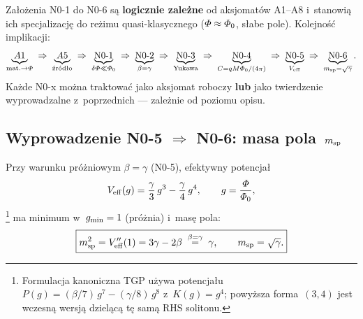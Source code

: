 \begin{remark}
Za\l{}o\.zenia N0-1 do N0-6 s\k{a} \textbf{logi\-cznie zale\.zne}
od aksjomat\'ow A1--A8 i~stanowi\k{a} ich spe\-cjali\-zacj\k{e}
do re\.zimu quasi-klasycznego ($\varPhi \approx \varPhi_0$, s\l{}abe pole).
Kolejno\'s\'c implikacji:
\begin{equation*}
  \underbrace{A1}_{\text{mat.}\to\Phi}
  \;\Rightarrow\;
  \underbrace{A5}_{\text{\'zr\'od\l{}o}}
  \;\Rightarrow\;
  \underbrace{\text{N0-1}}_{\delta\Phi\ll\PhiZero}
  \;\Rightarrow\;
  \underbrace{\text{N0-2}}_{\beta=\gamma}
  \;\Rightarrow\;
  \underbrace{\text{N0-3}}_{\text{Yukawa}}
  \;\Rightarrow\;
  \underbrace{\text{N0-4}}_{C=qM\Phi_0/(4\pi)}
  \;\Rightarrow\;
  \underbrace{\text{N0-5}}_{V_{\mathrm{eff}}}
  \;\Rightarrow\;
  \underbrace{\text{N0-6}}_{m_{\mathrm{sp}}=\sqrt{\gamma}}.
\end{equation*}
Ka\.zde N0-x mo\.zna traktowa\'c jako aksjomat roboczy \textbf{lub} jako
twierdzenie wyprowadzalne z~poprzednich --- zale\.znie od poziomu opisu.
\end{remark}

\subsection{Wyprowadzenie N0-5 $\Rightarrow$ N0-6: masa pola~$m_{\rm sp}$}%
\label{ssec:N0-derivation}

\begin{proposition}[N0-6 wynika z~N0-5]%
\label{prop:N0-6-from-N0-5}
Przy warunku pr\'o\.zniowym $\beta = \gamma$ (N0-5),
efektywny potencja\l{}
\begin{equation}\label{eq:Veff-N0-5}
  V_{\rm eff}(g) = \frac{\gamma}{3}\,g^3 - \frac{\gamma}{4}\,g^4,
  \qquad g = \frac{\varPhi}{\varPhi_0},
\end{equation}%
\footnote{Formulacja kanoniczna TGP u\.zywa potencja\l{}u $P(g) = (\beta/7)\,g^7 - (\gamma/8)\,g^8$ z~$K(g) = g^4$; powy\.zsza forma~$(3,4)$ jest wczesn\k{a} wersj\k{a} dziel\k{a}c\k{a} t\k{e} sam\k{a} RHS solitonu.}%
ma minimum w~$g_{\rm min} = 1$ (pr\'o\.znia) i~mas\k{e} pola:
\begin{equation}\label{eq:msp-N0-6}
  \boxed{m_{\rm sp}^2 = V_{\rm eff}''(1) = 3\gamma - 2\beta \;\overset{\beta=\gamma}{=}\; \gamma,
  \qquad m_{\rm sp} = \sqrt{\gamma}.}
\end{equation}
\end{proposition}

